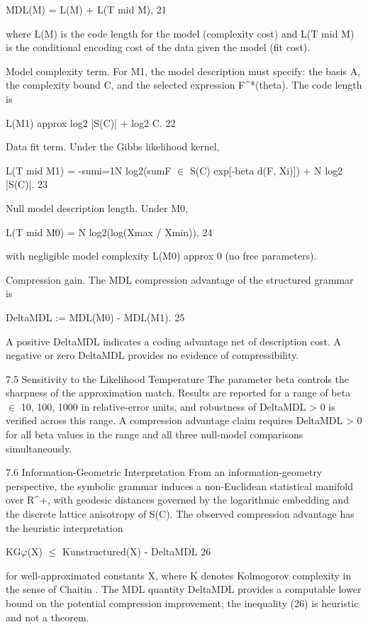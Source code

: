   MDL(M) = L(M) + L(T mid M), 21

  where L(M) is the code length for the model (complexity cost) and L(T mid M) is the
  conditional encoding cost of the data given the model (fit cost).

  Model complexity term. For M1, the model description must specify: the basis A, the
  complexity bound C, and the selected expression F\textasciicircum{}*(theta). The code length is

  L(M1) approx log2 |S(C)| + log2 C. 22

  Data fit term. Under the Gibbs likelihood kernel,

  L(T mid M1) = -sumi=1N log2(sumF $\in$ S(C) exp[-beta d(F, Xi)]) + N log2 |S(C)|. 23

  Null model description length. Under M0,

  L(T mid M0) = N log2(log(Xmax / Xmin)), 24

  with negligible model complexity L(M0) approx 0 (no free parameters).

  Compression gain. The MDL compression advantage of the structured grammar is

  DeltaMDL := MDL(M0) - MDL(M1). 25

  A positive DeltaMDL indicates a coding advantage net of description cost. A negative or
  zero DeltaMDL provides no evidence of compressibility.

  7.5 Sensitivity to the Likelihood Temperature
  The parameter beta controls the sharpness of the approximation match. Results are
  reported for a range of beta $\in$ {10, 100, 1000} in relative-error units, and robustness of
  DeltaMDL > 0 is verified across this range. A compression advantage claim requires
  DeltaMDL > 0 for all beta values in the range and all three null-model comparisons
  simultaneously.

  7.6 Information-Geometric Interpretation
  From an information-geometry perspective, the symbolic grammar induces a
  non-Euclidean statistical manifold over R\textasciicircum{}+, with geodesic distances governed by the
  logarithmic embedding and the discrete lattice anisotropy of S(C). The observed
  compression advantage has the heuristic interpretation

  KG$\varphi$(X) $\leq$ Kunstructured(X) - DeltaMDL 26

  for well-approximated constants X, where K denotes Kolmogorov complexity in the
  sense of Chaitin \citep{chaitin1987}. The MDL quantity DeltaMDL provides a computable lower
  bound on the potential compression improvement; the inequality (26) is heuristic and
  not a theorem.

